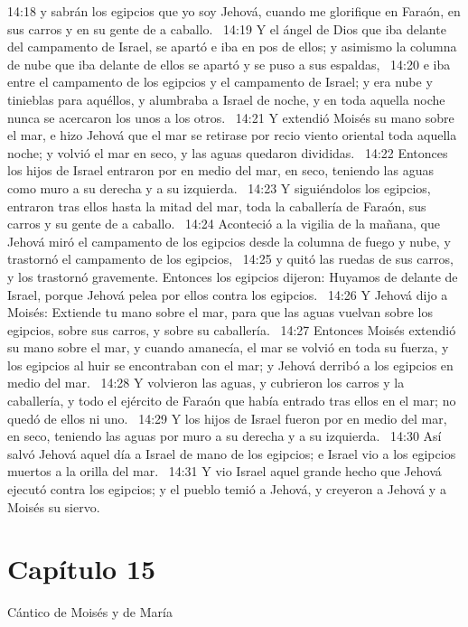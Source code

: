 14:18 y sabrán los egipcios que yo soy Jehová, cuando me glorifique en Faraón, en sus carros y en su gente de a caballo.  
14:19 Y el ángel de Dios que iba delante del campamento de Israel, se apartó e iba en pos de ellos; y asimismo la columna de nube que iba delante de ellos se apartó y se puso a sus espaldas,  
14:20 e iba entre el campamento de los egipcios y el campamento de Israel; y era nube y tinieblas para aquéllos, y alumbraba a Israel de noche, y en toda aquella noche nunca se acercaron los unos a los otros.  
14:21 Y extendió Moisés su mano sobre el mar, e hizo Jehová que el mar se retirase por recio viento oriental toda aquella noche; y volvió el mar en seco, y las aguas quedaron divididas.  
14:22 Entonces los hijos de Israel entraron por en medio del mar, en seco, teniendo las aguas como muro a su derecha y a su izquierda.  
14:23 Y siguiéndolos los egipcios, entraron tras ellos hasta la mitad del mar, toda la caballería de Faraón, sus carros y su gente de a caballo.  
14:24 Aconteció a la vigilia de la mañana, que Jehová miró el campamento de los egipcios desde la columna de fuego y nube, y trastornó el campamento de los egipcios,  
14:25 y quitó las ruedas de sus carros, y los trastornó gravemente. Entonces los egipcios dijeron: Huyamos de delante de Israel, porque Jehová pelea por ellos contra los egipcios.  
14:26 Y Jehová dijo a Moisés: Extiende tu mano sobre el mar, para que las aguas vuelvan sobre los egipcios, sobre sus carros, y sobre su caballería.  
14:27 Entonces Moisés extendió su mano sobre el mar, y cuando amanecía, el mar se volvió en toda su fuerza, y los egipcios al huir se encontraban con el mar; y Jehová derribó a los egipcios en medio del mar.  
14:28 Y volvieron las aguas, y cubrieron los carros y la caballería, y todo el ejército de Faraón que había entrado tras ellos en el mar; no quedó de ellos ni uno.  
14:29 Y los hijos de Israel fueron por en medio del mar, en seco, teniendo las aguas por muro a su derecha y a su izquierda.  
14:30 Así salvó Jehová aquel día a Israel de mano de los egipcios; e Israel vio a los egipcios muertos a la orilla del mar.  
14:31 Y vio Israel aquel grande hecho que Jehová ejecutó contra los egipcios; y el pueblo temió a Jehová, y creyeron a Jehová y a Moisés su siervo.  
\section*{Capítulo 15 }
Cántico de Moisés y de María 


